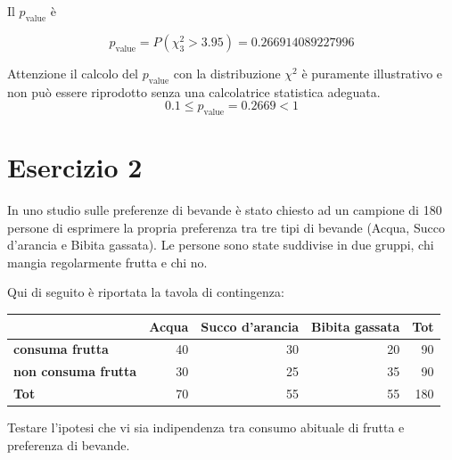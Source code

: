 \documentclass[
  11pt,
]{book}
\theoremstyle{mytheoremstyle}
\theoremstyle{mydefstyle}
\newenvironment{sol}
  {
  \begin{tcolorbox}[enhanced,breakable,arc=0.1mm,boxrule=1pt,colback=white,colframe=iblue,
  title=\bf \fontfamily{lmss}\selectfont \hspace{.5 cm} Soluzione,drop fuzzy shadow]

}{
\end{tcolorbox}
  }
\begin{document}
\begin{sol}
Il \(p_{\text{value}}\) è

\[ p_{\text{value}} = P(\chi^2_{3}>3.95)=0.266914089227996 \]

Attenzione il calcolo del \(p_\text{value}\) con la distribuzione \(\chi^2\) è puramente illustrativo e non può essere riprodotto senza una calcolatrice statistica adeguata.\[
 0.1 \leq p_\text{value}= 0.2669 < 1 
\]

\end{sol}

\section{Esercizio 2}\label{esercizio-2}

In uno studio sulle preferenze di bevande è stato chiesto ad un campione di 180 persone di esprimere la propria preferenza tra tre tipi di bevande (Acqua, Succo d'arancia e Bibita gassata). Le persone sono state suddivise in due gruppi, chi mangia regolarmente frutta e chi no.

Qui di seguito è riportata la tavola di contingenza:

\begin{table}[H]
\centering
\begin{tabular}{>{}lrrrr}
\toprule
  & Acqua & Succo d'arancia & Bibita gassata & Tot\\
\midrule
\textbf{consuma frutta} & 40 & 30 & 20 & 90\\
\textbf{non consuma frutta} & 30 & 25 & 35 & 90\\
\textbf{Tot} & 70 & 55 & 55 & 180\\
\bottomrule
\end{tabular}
\end{table}

Testare l'ipotesi che vi sia indipendenza tra consumo abituale di frutta e preferenza di bevande.
\end{document}
